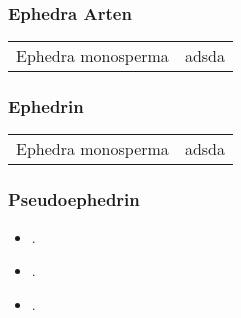 \documentclass{beamer}
\begin{document}
\begin{frame}[t,label=ephedraarten]
  \frametitle{Ephedra Arten}
  \begin{table}[htpb]
    \centering
    \begin{tabular}{cc}
      Ephedra monosperma & adsda  \\ 
    \end{tabular}
  \end{table}
\end{frame}

\begin{frame}[t,label=ephedrin]
  \frametitle{Ephedrin}
  \begin{table}[htpb]
    \centering
    \begin{tabular}{cc}
      Ephedra monosperma & adsda  \\ 
    \end{tabular}
  \end{table}
\end{frame}

\begin{frame}[t,label=pseudoephedrin]
  \frametitle{Pseudoephedrin}
    \begin{itemize}
      \item<1-> .
      \item<2-> .
      \item<3-> .
    \end{itemize}
\end{frame}
\end{document}
